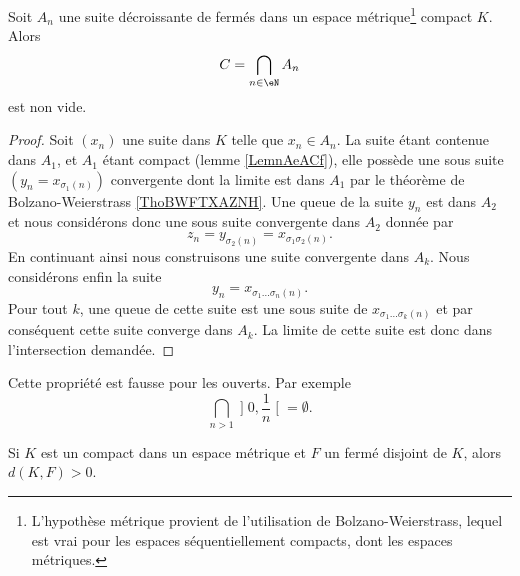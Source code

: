 \begin{lemma}       \label{LemooynkH}
    Soit \( A_n\) une suite décroissante de fermés dans un espace métrique\footnote{L'hypothèse métrique provient de l'utilisation de Bolzano-Weierstrass, lequel est vrai pour les espaces séquentiellement compacts, dont les espaces métriques.} compact \( K\). Alors
    \begin{equation}
        C=\bigcap_{n\in \eN}A_n
    \end{equation}
    est non vide. 
\end{lemma}

\begin{proof}
    Soit \( (x_n)\) une suite dans \( K\) telle que \( x_n\in A_n\). La suite étant contenue dans \( A_1\), et \( A_1\) étant compact (lemme \ref{LemnAeACf}), elle possède une sous suite \( (y_n=x_{\sigma_1(n)})\) convergente dont la limite est dans \( A_1\) par le théorème de Bolzano-Weierstrass \ref{ThoBWFTXAZNH}. Une queue de la suite \( y_n\) est dans \( A_2\) et nous considérons donc une sous suite convergente dans \( A_2\) donnée par
    \begin{equation}
        z_n=y_{\sigma_2(n)}=x_{\sigma_1\sigma_2(n)}.
    \end{equation}
    En continuant ainsi nous construisons une suite convergente dans \( A_k\). Nous considérons enfin la suite
    \begin{equation}
        y_n=x_{\sigma_1\ldots \sigma_n(n)}.
    \end{equation}
    Pour tout \( k\), une queue de cette suite est une sous suite de \( x_{\sigma_1\ldots \sigma_k(n)}\) et par conséquent cette suite converge dans \( A_k\). La limite de cette suite est donc dans l'intersection demandée.
\end{proof}

\begin{remark}
    Cette propriété est fausse pour les ouverts. Par exemple
    \begin{equation}
        \bigcap_{n>1}\mathopen] 0 , \frac{1}{ n } \mathclose[=\emptyset.
    \end{equation}
\end{remark}

\begin{lemma}   \label{LemKIcAbic}
    Si \( K\) est un compact dans un espace métrique et \( F\) un fermé disjoint de \( K\), alors \( d(K,F)>0\).
\end{lemma}

